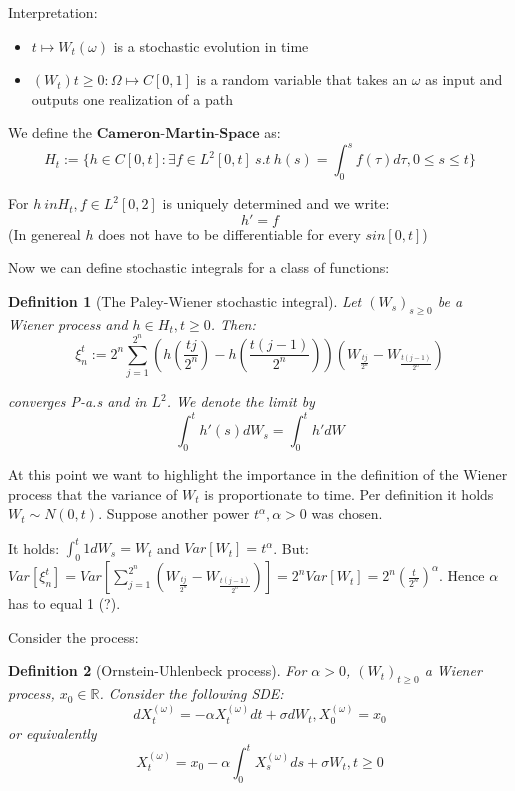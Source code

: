 \documentclass[%
thesis=student,%
coverpage=false,%
titlepage=false,%
headmarks=true, %
german,%
font=libertine, %
math=newpxtx, %
BCOR=5mm,%
coverBCOR=11mm%
]{tumbook}
\newtheorem{definition}{Definition}[section]
\begin{document}
Interpretation: 

\begin{itemize}
    \item $t \mapsto W_{t}(\omega)$ is a stochastic evolution in time
    \item $(W_{t}) t \geq 0: \Omega \mapsto C[0,1]$ is a random variable that takes an $\omega$ as input and outputs one realization of a path
\end{itemize}

We define the $\textbf{Cameron-Martin-Space}$ as:
\[
H_{t} := \{ h \in C[0,t]: \exists f \in L^{2}[0,t] \ s.t \  h(s) = \int_{0}^{s} f(\tau) d\tau, 0 \leq s \leq t \}
\]

For $h \ in H_{t}, f \in L^{2}[0,2]$ is uniquely determined and we write: 
\[
h' = f
\]
(In genereal $h$ does not have to be differentiable for every $s in [0,t]$)

Now we can define stochastic integrals for a class of functions:

\begin{definition}[The Paley-Wiener stochastic integral] 
Let $(W_{s})_{s\geq 0}$ be a Wiener process and $h \in H_{t}, t \geq 0$. Then:
\[
\xi_{n}^{t} := 2^{n}\sum_{j=1}^{2^{n}}(h(\frac{tj}{2^{n}})-h(\frac{t(j-1)}{2^{n}}))(W_{\frac{tj}{2^{n}}}-W_{\frac{t(j-1)}{2^{n}}}) 
\]

converges P-a.s and in $L^{2}$. We denote the limit by
\[
\int_{0}^{t}h'(s)dW_{s} = \int_{0}^{t}h'dW
\]
\end{definition}

At this point we want to highlight the importance in the definition of the Wiener process that the variance of $W_{t}$ is proportionate to time. Per definition it holds $W_{t} \sim N(0,t)$. Suppose another power $t^{\alpha}, \alpha > 0$ was chosen. 

It holds: $\int_{0}^{t} 1 dW_{s} = W_{t}$ and $Var[W_{t}] = t^{\alpha}$. But: 
$Var[\xi_{n}^{t}] = Var\left[\sum_{j=1}^{2^{n}}\left(W_{\frac{tj}{2^{n}}} - W_{\frac{t(j-1)}{2^{n}}}\right)\right] = 2^{n}Var\left[W_{t}\right] = 2^{n}\left(\frac{t}{2^{n}}\right)^{\alpha}$. Hence $\alpha$ has to equal 1 (?).

Consider the process:

\begin{definition}[Ornstein-Uhlenbeck process] 
For $\alpha > 0$, $(W_{t})_{t\geq 0}$ a Wiener process, $x_{0} \in \mathbb{R}$. Consider the following SDE:
\[
dX_{t}^{(\omega)} = -\alpha X_{t}^{(\omega)} dt + \sigma dW_{t}, X_{0}^{(\omega)} = x_{0}
\]
or equivalently
\[
X_{t}^{(\omega)} = x_{0} - \alpha\int_{0}^{t}X_{s}^{(\omega)}ds + \sigma W_{t}, t \geq 0
\]  
\end{definition}
\end{document}

